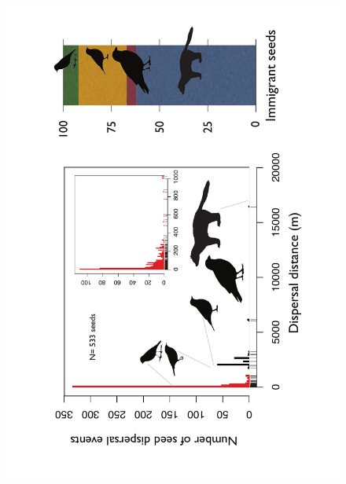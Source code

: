 \documentclass[a4paper, 12pt]{article}
\begin{document}
\begin{linenumbers}
\newpage 
\begin{figure}[htbp]
\centerline{\includegraphics[height=26cm]{Fig3.pdf}}
%
\end{figure}


\end{linenumbers}
\end{document}
